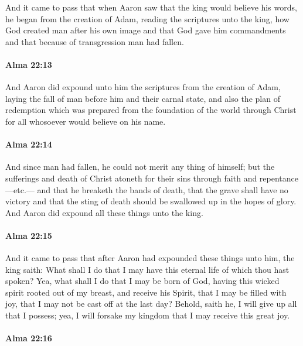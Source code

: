 			And it came to pass that when Aaron saw that the king would believe his words,
			he began from the creation of Adam,
			reading the scriptures unto the king,
			how God created man after his own image
			and that God gave him commandments
			and that because of transgression man had fallen.

		\paragraph{Alma 22:13} %
			\label{ALMA-22-13}

			And Aaron did expound unto him the scriptures from the creation of Adam,
			laying the fall of man before him and their carnal state,
			and also the plan of redemption
			which was prepared from the foundation of the world through Christ
			for all whosoever would believe on his name.

		\paragraph{Alma 22:14} %
			\label{ALMA-22-14}

			And since man had fallen, he could not merit any thing of himself;
			but the sufferings and death of Christ atoneth for their sins
			through faith and repentance---etc.---
			and that he breaketh the bands of death,
			that the grave shall have no victory
			and that the sting of death should be swallowed up in the hopes of glory.
			And Aaron did expound all these things unto the king.
			
		\paragraph{Alma 22:15} %
			\label{ALMA-22-15}
			
			And it came to pass that
			after Aaron had expounded these things unto him,
			the king saith:
			What shall I do that I may have this eternal life of which thou hast spoken?
			Yea, what shall I do that I may be born of God,
			having this wicked spirit rooted out of my breast,
			and receive his Spirit, that I may be filled with joy,
			that I may not be cast off at the last day?
			Behold, saith he, I will give up all that I possess;
			yea, I will forsake my kingdom that I may receive this great joy.

		\paragraph{Alma 22:16} %
			\label{ALMA-22-16}

